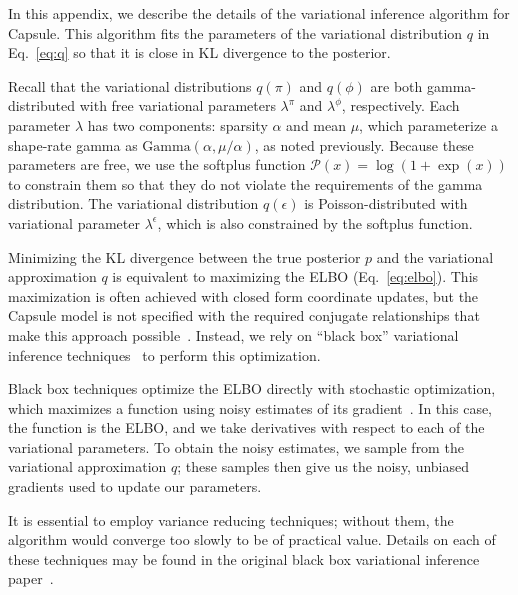 In this appendix, we describe the details of the variational inference algorithm for Capsule. This algorithm fits the parameters of the variational distribution $q$ in Eq.~\ref{eq:q} so that it is close in KL divergence to the posterior.

Recall that the variational distributions $q(\pi)$ and $q(\phi)$ are both gamma-distributed with free variational parameters $\lambda^\pi$ and $\lambda^\phi$, respectively.  Each parameter $\lambda$ has two components: sparsity $\alpha$ and mean $\mu$, which parameterize a shape-rate gamma as $\mbox{Gamma}(\alpha,\mu/\alpha)$, as noted previously. Because these parameters are free, we use the softplus function $\mathcal{P}(x) = \log(1+\exp(x))$ to constrain them so that they do not violate the requirements of the gamma distribution.
The variational distribution $q(\epsilon)$ is Poisson-distributed with variational parameter $\lambda^\epsilon$, which is also constrained by the softplus function.

Minimizing the KL divergence between the true posterior $p$ and the variational approximation $q$ is equivalent to maximizing the ELBO (Eq.~\ref{eq:elbo}).  This maximization is often achieved with closed form coordinate updates, but the Capsule model is not specified with the required conjugate relationships that make this approach possible~\cite{Ghahramani:2001}.  Instead, we rely on ``black box'' variational inference techniques~\cite{Ranganath:2014} to perform this optimization.

Black box techniques optimize the ELBO directly with stochastic optimization, which maximizes a function using noisy estimates of its gradient~\cite{Robbins:1951}.  In this case, the function is the ELBO, and we take derivatives with respect to each of the variational parameters.  To obtain the noisy estimates, we sample from the variational approximation $q$; these samples then give us the noisy, unbiased gradients used to update our parameters.

It is essential to employ variance reducing techniques; without them, the algorithm would converge too slowly to be of practical value.  Details on each of these techniques may be found in the original black box variational inference paper~\cite{Ranganath:2014}.


